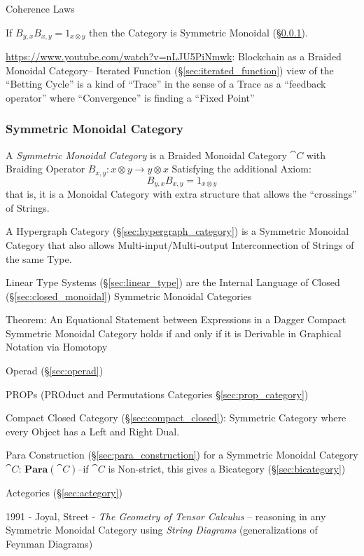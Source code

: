 Coherence Laws

If $B_{y,x} B_{x,y} = 1_{x \otimes y}$ then the Category is Symmetric
Monoidal (\S\ref{sec:symmetric_monoidal}).

\url{https://www.youtube.com/watch?v=nLJU5PiNmwk}: Blockchain as a Braided
Monoidal Category-- Iterated Function (\S\ref{sec:iterated_function}) view of
the ``Betting Cycle'' is a kind of ``Trace'' in the sense of a Trace as a
``feedback operator'' where ``Convergence'' is finding a ``Fixed Point''



\subsubsection{Symmetric Monoidal Category}\label{sec:symmetric_monoidal}

A \emph{Symmetric Monoidal Category} is a Braided Monoidal Category $\cat{C}$
with Braiding Operator $B_{x,y} : x \otimes y \rightarrow y \otimes x$
Satisfying the additional Axiom:
\[
  B_{y,x} B_{x,y} = 1_{x \otimes y}
\]
that is, it is a Monoidal Category with extra structure that allows the
``crossings'' of Strings.

A Hypergraph Category (\S\ref{sec:hypergraph_category}) is a Symmetric Monoidal
Category that also allows Multi-input/Multi-output Interconnection of Strings of
the same Type.

Linear Type Systems (\S\ref{sec:linear_type}) are the Internal Language of
Closed (\S\ref{sec:closed_monoidal}) Symmetric Monoidal Categories

Theorem: An Equational Statement between Expressions in a Dagger
Compact Symmetric Monoidal Category holds if and only if it is
Derivable in Graphical Notation via Homotopy %

Operad (\S\ref{sec:operad})

\fist PROPs (PROduct and Permutations Categories \S\ref{sec:prop_category})

Compact Closed Category (\S\ref{sec:compact_closed}): Symmetric
Category where every Object has a Left and Right Dual.

Para Construction (\S\ref{sec:para_construction}) for a Symmetric Monoidal
Category $\cat{C}$: $\mathbf{Para}(\cat{C})$--if $\cat{C}$ is Non-strict, this
gives a Bicategory (\S\ref{sec:bicategory})

Actegories (\S\ref{sec:actegory})

1991 - Joyal, Street - \emph{The Geometry of Tensor Calculus} -- reasoning in
any Symmetric Monoidal Category using \emph{String Diagrams} (generalizations
of Feynman Diagrams)

